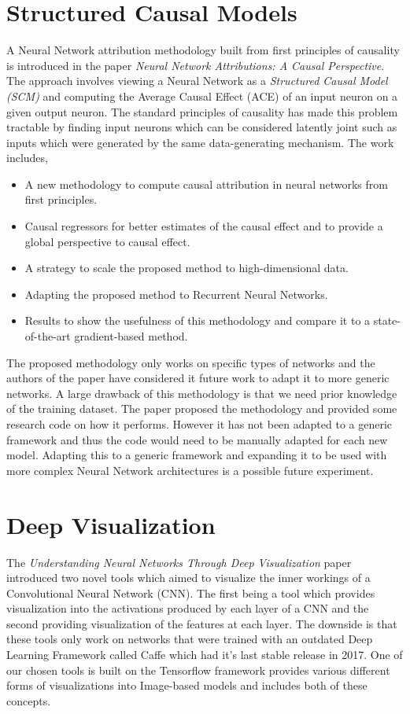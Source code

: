 \section{Structured Causal Models}
 A Neural Network attribution methodology built from first principles of causality \cite{10.5555/1642718} \cite{DBLP:journals/corr/abs-1210-4852} is introduced in the paper \emph{Neural Network Attributions: A Causal Perspective}\cite{DBLP:journals/corr/abs-1902-02302}. The approach involves viewing a Neural Network as a \emph{Structured Causal Model (SCM)} \cite{10.5555/1642718} and computing the Average Causal Effect (ACE) \cite{rubin1978} of an input neuron on a given output neuron. The standard principles of causality has made this problem tractable by finding input neurons which can be considered latently joint such as inputs which were generated by the same data-generating mechanism. The work includes,
 \begin{itemize}
     \item A new methodology to compute causal attribution in neural networks from first principles.
     \item Causal regressors for better estimates of the causal effect and to provide a global perspective to causal effect.
     \item A strategy to scale the proposed method to high-dimensional data.
     \item Adapting the proposed method to Recurrent Neural Networks.
     \item Results to show the usefulness of this methodology and compare it to a state-of-the-art gradient-based method.
 \end{itemize}
The proposed methodology only works on specific types of networks and the authors of the paper have considered it future work to adapt it to more generic networks. A large drawback of this methodology is that we need prior knowledge of the training dataset. The paper proposed the methodology and provided some research code on how it performs. However it has not been adapted to a generic framework and thus the code would need to be manually adapted for each new model. Adapting this to a generic framework and expanding it to be used with more complex Neural Network architectures is a possible future experiment.

\section{Deep Visualization}
The \emph{Understanding Neural Networks Through Deep Visualization} \cite{DBLP:journals/corr/YosinskiCNFL15} paper introduced two novel tools which aimed to visualize the inner workings of a  Convolutional Neural Network (CNN). The first being a tool which provides visualization into the activations produced  by  each  layer  of a CNN and the second providing visualization of the features at each layer. The downside is that these tools only work on networks that were trained with an outdated Deep Learning Framework called Caffe \cite{jia2014caffe} which had it's last stable release in 2017. One of our chosen tools is built on the Tensorflow framework provides various different forms of visualizations into Image-based models and includes both of these concepts.
